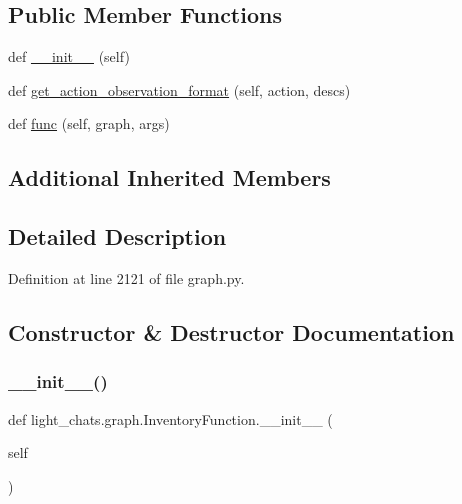 \subsection*{Public Member Functions}
\begin{DoxyCompactItemize}
\item 
def \hyperlink{classlight__chats_1_1graph_1_1InventoryFunction_a4fa076967af0f8541f53e92721777f27}{\+\_\+\+\_\+init\+\_\+\+\_\+} (self)
\item 
def \hyperlink{classlight__chats_1_1graph_1_1InventoryFunction_a9527cd8b211efa8aafc21b2a40b14760}{get\+\_\+action\+\_\+observation\+\_\+format} (self, action, descs)
\item 
def \hyperlink{classlight__chats_1_1graph_1_1InventoryFunction_ae1d63ccf80bca5e20060ca5ffb8a684a}{func} (self, graph, args)
\end{DoxyCompactItemize}
\subsection*{Additional Inherited Members}


\subsection{Detailed Description}


Definition at line 2121 of file graph.\+py.



\subsection{Constructor \& Destructor Documentation}
\mbox{\label{classlight__chats_1_1graph_1_1InventoryFunction_a4fa076967af0f8541f53e92721777f27}} 
\subsubsection{\texorpdfstring{\+\_\+\+\_\+init\+\_\+\+\_\+()}{\_\_init\_\_()}}
{\footnotesize\ttfamily def light\+\_\+chats.\+graph.\+Inventory\+Function.\+\_\+\+\_\+init\+\_\+\+\_\+ (\begin{DoxyParamCaption}\item[{}]{self }\end{DoxyParamCaption})}



